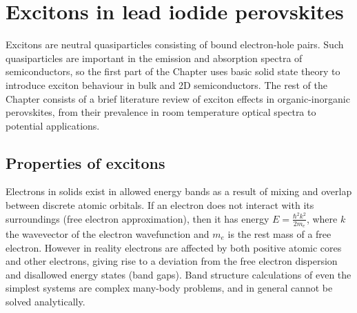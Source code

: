 
\chapter{Excitons in lead iodide perovskites}

\graphicspath{{Chapter2/Figures/}}

Excitons are neutral quasiparticles consisting of bound electron-hole pairs. Such quasiparticles are important in the emission and absorption spectra of semiconductors, so the first part of the Chapter uses basic solid state theory to introduce exciton behaviour in bulk and 2D semiconductors. The rest of the Chapter consists of a brief literature review of exciton effects in organic-inorganic perovskites, from their prevalence in room temperature optical spectra to potential applications.

\section{Properties of excitons}
Electrons in solids exist in allowed energy bands as a result of mixing and overlap between discrete atomic orbitals. If an electron does not interact with its surroundings (free electron approximation), then it has energy $E=\frac{\hbar^2k^2}{2m_e}$, where $k$ the wavevector of the electron wavefunction and $m_e$ is the rest mass of a free electron. However in reality electrons are affected by both positive atomic cores and other electrons, giving rise to a deviation from the free electron dispersion and disallowed energy states (band gaps). Band structure calculations of even the simplest systems are complex many-body problems, and in general cannot be solved analytically.

